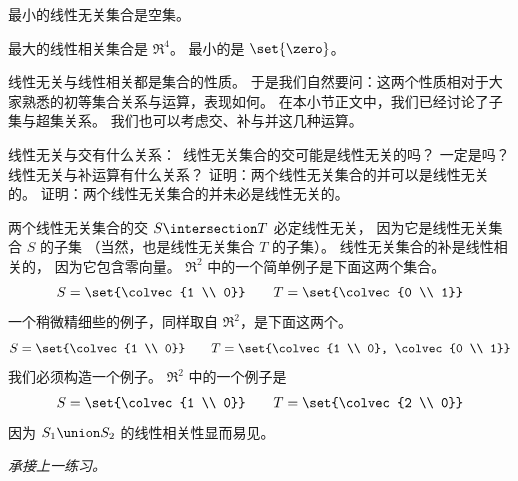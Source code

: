 \begin{answer}
      最小的线性无关集合是空集。

      最大的线性相关集合是 \( \Re^4 \)。
      最小的是 \( \set{\zero} \)。
    \end{answer}
  \recommended \item
    线性无关与线性相关都是集合的性质。
    于是我们自然要问：这两个性质相对于大家熟悉的初等集合关系与运算，表现如何。
    在本小节正文中，我们已经讨论了子集与超集关系。
    我们也可以考虑交、补与并这几种运算。
    \begin{exparts}
       \partsitem 线性无关与交有什么关系：~线性无关集合的交可能是线性无关的吗？
         一定是吗？
       \partsitem 线性无关与补运算有什么关系？
       \partsitem 证明：两个线性无关集合的并可以是线性无关的。
       \partsitem 证明：两个线性无关集合的并未必是线性无关的。
    \end{exparts}
    \begin{answer}
      \begin{exparts}
        \partsitem 两个线性无关集合的交 $S\intersection T$ 必定线性无关，
          因为它是线性无关集合 $S$ 的子集
          （当然，也是线性无关集合 $T$ 的子集）。
        \partsitem 线性无关集合的补是线性相关的，
          因为它包含零向量。
        \partsitem \( \Re^2 \) 中的一个简单例子是下面这两个集合。
          \begin{equation*}
            S=\set{\colvec{1 \\ 0}}
            \qquad
            T=\set{\colvec{0 \\ 1}}
          \end{equation*}
          一个稍微精细些的例子，同样取自 \( \Re^2 \)，是下面这两个。
          \begin{equation*}
            S=\set{\colvec{1 \\ 0}}
            \qquad
            T=\set{\colvec{1 \\ 0}, \colvec{0 \\ 1}}
          \end{equation*}
        \partsitem 我们必须构造一个例子。
          \( \Re^2 \) 中的一个例子是
          \begin{equation*}
            S=\set{\colvec{1 \\ 0}}
            \qquad
            T=\set{\colvec{2 \\ 0}}
          \end{equation*}
          因为 \( S_1\union S_2 \) 的线性相关性显而易见。
      \end{exparts}
    \end{answer}
  \item \textit{承接上一练习。}
